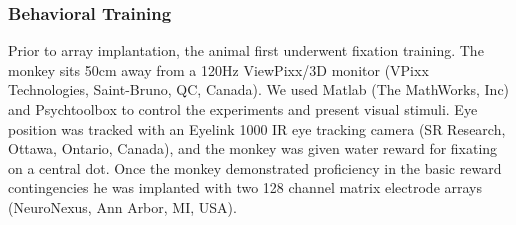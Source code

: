 \subsubsection*{Behavioral Training} Prior to array implantation, the animal first underwent fixation training. The monkey sits 50cm away from a 120Hz ViewPixx/3D monitor (VPixx Technologies, Saint-Bruno, QC, Canada). We used Matlab (The MathWorks, Inc) and Psychtoolbox to control the experiments and present visual stimuli. Eye position was tracked with an Eyelink 1000 IR eye tracking camera (SR Research, Ottawa, Ontario, Canada), and the monkey was given water reward for fixating on a central dot. Once the monkey demonstrated proficiency in the basic reward contingencies he was implanted with two 128 channel matrix electrode arrays (NeuroNexus, Ann Arbor, MI, USA).

